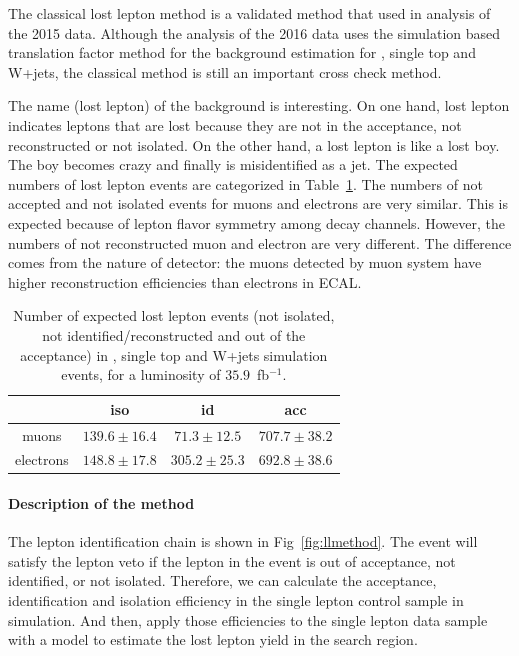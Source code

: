 The classical lost lepton method is a validated method that used in analysis of the 2015 data\cite{PhysRevD.96.012004}. Although the analysis of the 2016 data uses the simulation based translation factor method for the background estimation for \ttbar, single top and W+jets, the classical method is still an important cross check method. 

The name (lost lepton) of the background is interesting. On one hand, lost lepton indicates leptons that are lost because they are not in the acceptance, not reconstructed or not isolated. On the other hand, a lost lepton is like a lost boy. The boy becomes crazy and finally is misidentified as a jet. The expected numbers of lost lepton events are categorized in Table~\ref{tab:nexpLL}. The numbers of not accepted and not isolated events for muons and electrons are very similar. This is expected because of lepton flavor symmetry among \ttbar decay channels. However, the numbers of not reconstructed muon and electron are very different. The difference comes from the nature of detector: the muons detected by muon system have higher reconstruction efficiencies than electrons in ECAL. 

\begin{table}[htbp]
\fontsize{10 pt}{1.2 em}
\caption{Number of expected lost lepton events (not isolated, not identified/reconstructed and out of the acceptance) in \ttbar, single top and W+jets simulation events, for a luminosity of $35.9$~fb$^{-1}$.} 
\begin{center}
\begin{tabular}{|c|c|c|c|}
\hline
          & iso  & id   & acc \\
\hline
muons     & $139.6\pm16.4$ & $71.3\pm12.5$ & $707.7\pm38.2$ \\
electrons & $148.8\pm17.8$ & $305.2\pm25.3$ & $692.8\pm38.6$ \\
\hline\end{tabular}
\end{center}
\label{tab:nexpLL}
\end{table}

\paragraph{Description of the method}

The lepton identification chain is shown in Fig~\ref{fig:llmethod}. The event will satisfy the lepton veto if the lepton in the event is out of acceptance, not identified, or not isolated. Therefore, we can calculate the acceptance, identification and isolation efficiency in the single lepton control sample in simulation. And then, apply those efficiencies to the single lepton data sample with a model to estimate the lost lepton yield in the search region. 

